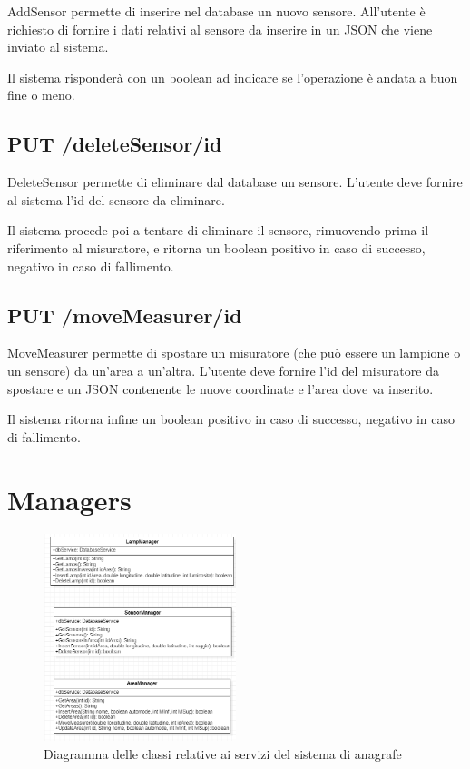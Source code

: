 AddSensor permette di inserire nel database un nuovo sensore. All'utente è richiesto di fornire i dati relativi al sensore da inserire in un JSON che viene inviato al sistema.

Il sistema risponderà con un boolean ad indicare se l'operazione è andata a buon fine o meno.

\subsection{ PUT /deleteSensor/id}

DeleteSensor permette di eliminare dal database un sensore. L'utente deve fornire al sistema l'id del sensore da eliminare.

Il sistema procede poi a tentare di eliminare il sensore, rimuovendo prima il riferimento al misuratore, e ritorna un boolean positivo in caso di successo, negativo in caso di fallimento.

\subsection { PUT /moveMeasurer/id}

MoveMeasurer permette di spostare un misuratore (che può essere un lampione o un sensore) da un'area a un'altra. L'utente deve fornire l'id del misuratore da spostare e un JSON contenente le nuove coordinate e l'area dove va inserito.

Il sistema ritorna infine un boolean positivo in caso di successo, negativo in caso di fallimento.

\section{Managers}

\begin{figure}[ht]
    \centering
    \includegraphics[width=0.5\textwidth]{img/managers_anagrafe.png}
    \caption{Diagramma delle classi relative ai servizi del sistema di anagrafe}
    \label{fig:managers_anagrafe}
\end{figure}

